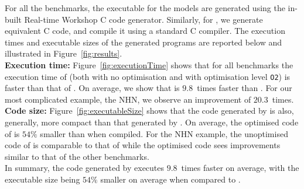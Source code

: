 For all the benchmarks, the executable for the \simulink models are
generated using the in-built Real-time
Workshop\textsuperscript{\textregistered} C code generator.  Similarly,
for \ourTool, we generate equivalent C code, and compile it using a
standard C compiler.
The execution times and executable sizes of the generated programs are reported below and illustrated in Figure~\ref{fig:results}.\\

\textbf{Execution time:} Figure~\ref{fig:executionTime} shows that for
all benchmarks the execution time of \ourTool (both with no optimisation
and with optimisation level \texttt{O2}) is faster than that of
\simulink.  On average, we show that \ourTool is $9.8$~times faster than
\simulink.
For our most complicated example, the \ac{NHN}, we observe an improvement of 
$20.3$~times.\\

\textbf{Code size:} Figure~\ref{fig:executableSize} shows that the code
generated by \ourTool is also, generally, more compact than that
generated by \simulink.  On average, the optimised code of \ourTool is
$54\%$ smaller than \simulink when compiled.
For the \ac{NHN} example, the unoptimised code of \ourTool is comparable to 
that of \simulink while the optimised code sees improvements similar to that of 
the other benchmarks.\\

In summary, the code generated by \ourTool executes $9.8$~times faster
on average, with the executable size being $54\%$ smaller on average
when compared to \simulink.




